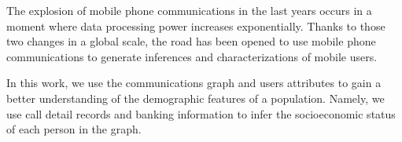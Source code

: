 
The explosion of mobile phone communications in the last years occurs in a moment where data processing power increases exponentially.  Thanks to those two changes in a global scale, the road has been opened to use mobile phone communications to generate inferences and characterizations of mobile users.

In this work, we use the communications graph and users attributes to gain a better understanding of the demographic features of a population. Namely, we use 
call detail records and banking information to infer the socioeconomic status of each person in the graph.


